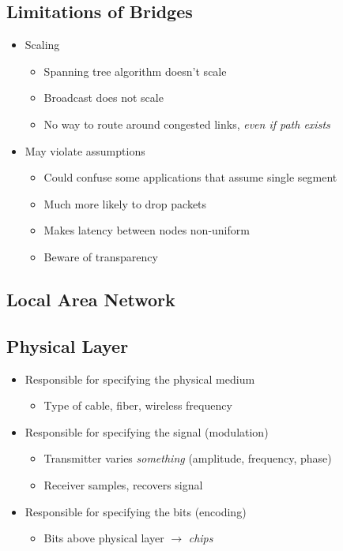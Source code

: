 \subsection{Limitations of Bridges}
\begin{itemize}[nosep]
    \item Scaling
          \begin{itemize}[nosep]
              \item Spanning tree algorithm doesn't scale
              \item Broadcast does not scale
              \item No way to route around congested links, \emph{even if path exists}
          \end{itemize}
    \item May violate assumptions
          \begin{itemize}[nosep]
              \item Could confuse some applications that assume single segment
              \item Much more likely to drop packets
              \item Makes latency between nodes non-uniform
              \item Beware of transparency
          \end{itemize}
\end{itemize}

\subsection{Local Area Network}
\subsection{Physical Layer}
\begin{itemize}[nosep]
    \item Responsible for specifying the physical medium
          \begin{itemize}[nosep]
              \item Type of cable, fiber, wireless frequency
          \end{itemize}
    \item Responsible for specifying the signal (modulation)
          \begin{itemize}[nosep]
              \item Transmitter varies \emph{something} (amplitude, frequency, phase)
              \item Receiver samples, recovers signal
          \end{itemize}
    \item Responsible for specifying the bits (encoding)
          \begin{itemize}[nosep]
              \item Bits above physical layer $\to$ \emph{chips}
          \end{itemize}
\end{itemize}

